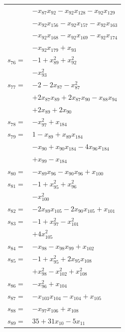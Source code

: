 \begin{longtable}{@{}r@{\;}l@{}}
 & \(\displaystyle -x_{87}x_{92} -x_{92}x_{128} -x_{92}x_{129}\) \\
 & \(\displaystyle -x_{92}x_{156} -x_{92}x_{157} -x_{92}x_{163}\) \\
 & \(\displaystyle -x_{92}x_{168} -x_{92}x_{169} -x_{92}x_{174}\) \\
 & \(\displaystyle -x_{92}x_{179} +x_{93}\) \\[3pt]
\(s_{76}=\) & \(\displaystyle -1 +x_{89}^{2} +x_{92}^{2}\) \\
 & \(\displaystyle -x_{93}^{2}\) \\[3pt]
\(s_{77}=\) & \(\displaystyle -2 -2x_{87} -x_{87}^{2}\) \\
 & \(\displaystyle +2x_{87}x_{89} +2x_{87}x_{90} -x_{88}x_{94}\) \\
 & \(\displaystyle +2x_{89} +2x_{90}\) \\[3pt]
\(s_{78}=\) & \(\displaystyle -x_{97}^{2} +x_{184}\) \\[3pt]
\(s_{79}=\) & \(\displaystyle 1 -x_{89} +x_{89}x_{184}\) \\
 & \(\displaystyle -x_{90} +x_{90}x_{184} -4x_{96}x_{184}\) \\
 & \(\displaystyle +x_{99} -x_{184}\) \\[3pt]
\(s_{80}=\) & \(\displaystyle -x_{89}x_{96} -x_{90}x_{96} +x_{100}\) \\[3pt]
\(s_{81}=\) & \(\displaystyle -1 +x_{95}^{2} +x_{96}^{2}\) \\
 & \(\displaystyle -x_{100}^{2}\) \\[3pt]
\(s_{82}=\) & \(\displaystyle -2x_{89}x_{105} -2x_{90}x_{105} +x_{101}\) \\[3pt]
\(s_{83}=\) & \(\displaystyle -1 +x_{97}^{2} -x_{101}^{2}\) \\
 & \(\displaystyle +4x_{105}^{2}\) \\[3pt]
\(s_{84}=\) & \(\displaystyle -x_{98} -x_{98}x_{99} +x_{102}\) \\[3pt]
\(s_{85}=\) & \(\displaystyle -1 +x_{95}^{2} +2x_{95}x_{108}\) \\
 & \(\displaystyle +x_{98}^{2} -x_{102}^{2} +x_{108}^{2}\) \\[3pt]
\(s_{86}=\) & \(\displaystyle -x_{96}^{2} +x_{104}\) \\[3pt]
\(s_{87}=\) & \(\displaystyle -x_{103}x_{104} -x_{104} +x_{105}\) \\[3pt]
\(s_{88}=\) & \(\displaystyle -x_{97}x_{106} +x_{108}\) \\[3pt]
\(s_{89}=\) & \(\displaystyle 35 +31x_{10} -5x_{11}\) \\

\end{longtable}
